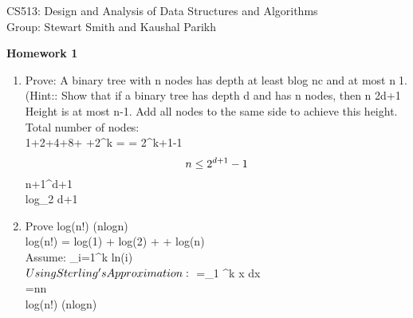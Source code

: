 \documentclass[11pt]{article}
\begin{document}
\sloppy

\noindent CS513: Design and Analysis of Data Structures and Algorithms \\
Group: Stewart Smith and Kaushal Parikh\\

\begin{center}
    \LARGE{\textbf{Homework 1}}\\
\end{center}

\vspace{.1in}

\begin{enumerate}

\item Prove: A binary tree with n nodes has depth at least blog nc and at most n􀀀1. (Hint:: Show that if a binary tree has depth d and has n nodes, then n  2d+1 􀀀 \\
    Height is at most n-1.  Add all nodes to the same side to achieve this height.\\
    Total number of nodes:\\
    1+2+4+8+ \cdots +2^k =  = 2^{k+1}-1\\
    $$n\leq 2^{d+1}-1\\
    $$n+1^{d+1}\\
    log_2 \leq d+1\\

\item Prove log(n!) \in \Theta({nlogn})\\
    log(n!) = log(1) + log(2) + \cdots + log(n) \\
    Assume: \sum_{i=1}^k ln(i)\\
    $Using Sterling's Approximation:\\$
    =\int _1 ^k \ln x dx\\
    =n\ln n \\
    log(n!) \in \Theta(nlogn)\\


\end{enumerate}
\end{document}

